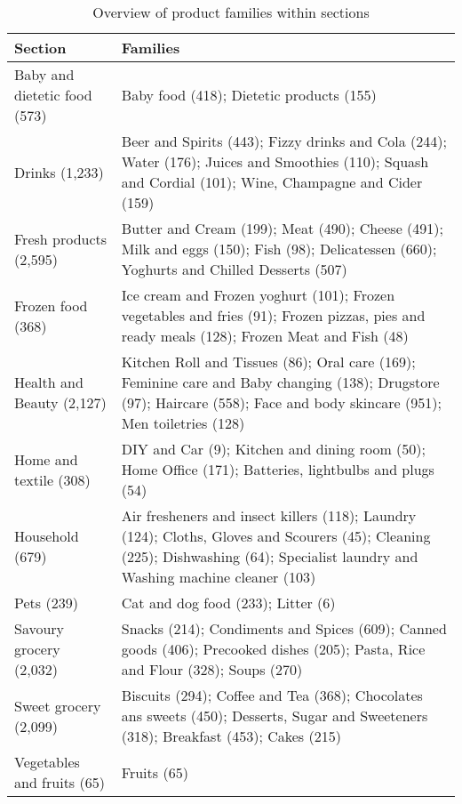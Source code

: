 \documentclass[english]{article}
\begin{document}
\begin{table}[H]
\renewcommand{\arraystretch}{0.8}%
\caption{Overview of product families within sections}\label{tab:qlmc_families}
\small
\begin{tabularx}{\linewidth}{l >{\setlength{\baselineskip}{0.75\baselineskip}}X}
\toprule
\toprule
    Section & Families \\
    \midrule
    Baby and dietetic food (573) & Baby food (418); Dietetic products (155) \\
    Drinks (1,233) & Beer and Spirits (443); Fizzy drinks and Cola (244); Water (176); Juices and Smoothies (110); Squash and Cordial (101); Wine, Champagne and Cider (159) \\
    Fresh products (2,595) & Butter and Cream (199); Meat (490); Cheese (491); Milk and eggs (150); Fish (98); Delicatessen (660); Yoghurts and Chilled Desserts (507) \\
    Frozen food (368) & Ice cream and Frozen yoghurt (101); Frozen vegetables and fries (91); Frozen pizzas, pies and ready meals (128); Frozen Meat and Fish (48) \\
    Health and Beauty (2,127) & Kitchen Roll and Tissues (86); Oral care (169); Feminine care and Baby changing (138); Drugstore (97); Haircare (558); Face and body skincare (951); Men toiletries (128) \\
    Home and textile (308) & DIY and Car (9); Kitchen and dining room (50); Home Office (171); Batteries, lightbulbs and plugs (54) \\
    Household (679) & Air fresheners and insect killers (118); Laundry (124); Cloths, Gloves and Scourers (45); Cleaning (225); Dishwashing (64); Specialist laundry and Washing machine cleaner (103) \\
    Pets (239) & Cat and dog food (233); Litter (6) \\
    Savoury grocery (2,032) & Snacks (214); Condiments and Spices (609); Canned goods (406); Precooked dishes (205); Pasta, Rice and Flour (328); Soups (270) \\
    Sweet grocery (2,099) & Biscuits (294); Coffee and Tea (368); Chocolates ans sweets (450); Desserts, Sugar and Sweeteners (318); Breakfast (453); Cakes (215) \\
    Vegetables and fruits (65) & Fruits (65) \\
\bottomrule
\bottomrule
\end{tabularx}
\end{table}
\end{document}
